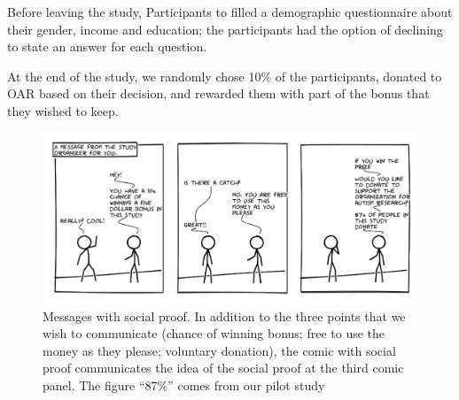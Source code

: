 Before leaving the study, Participants to filled a demographic questionnaire about their gender, income and education; the participants had the option of declining to state an answer for each question.

At the end of the study, we randomly chose 10\% of the participants, donated to OAR based on their decision, and rewarded them with part of the bonus that they wished to keep.




\begin{figure}[bt]
    \centering
    \includegraphics[width=\columnwidth]{./figures/social_proof.png}
    \caption{Messages with social proof. In addition to the three points that we wish to communicate (chance of winning bonus; free to use the money as they please; voluntary donation), the comic with social proof communicates the idea of the social proof at the third comic panel. The figure ``87\%'' comes from our pilot study}
    \label{fig:basic three comic social proof}
\end{figure}



